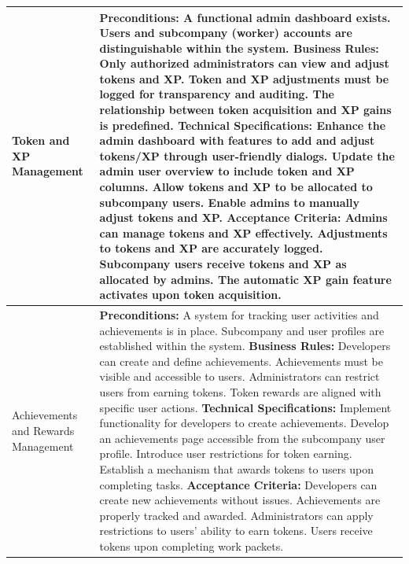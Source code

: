\begin{longtable}{|m{3cm}|m{12cm}|}
Token and XP Management &
\textbf{Preconditions:} \newline A functional admin dashboard exists. Users and subcompany (worker) accounts are distinguishable within the system. \newline
\textbf{Business Rules:} \newline Only authorized administrators can view and adjust tokens and XP. Token and XP adjustments must be logged for transparency and auditing. The relationship between token acquisition and XP gains is predefined. \newline
\textbf{Technical Specifications:} \newline Enhance the admin dashboard with features to add and adjust tokens/XP through user-friendly dialogs. Update the admin user overview to include token and XP columns. Allow tokens and XP to be allocated to subcompany users. Enable admins to manually adjust tokens and XP. \newline
\textbf{Acceptance Criteria:} \newline Admins can manage tokens and XP effectively. Adjustments to tokens and XP are accurately logged. Subcompany users receive tokens and XP as allocated by admins. The automatic XP gain feature activates upon token acquisition. \\
\hline

Achievements and Rewards Management &
\textbf{Preconditions:} \newline A system for tracking user activities and achievements is in place. Subcompany and user profiles are established within the system. \newline
\textbf{Business Rules:} \newline Developers can create and define achievements. Achievements must be visible and accessible to users. Administrators can restrict users from earning tokens. Token rewards are aligned with specific user actions. \newline
\textbf{Technical Specifications:} \newline Implement functionality for developers to create achievements. Develop an achievements page accessible from the subcompany user profile. Introduce user restrictions for token earning. Establish a mechanism that awards tokens to users upon completing tasks. \newline
\textbf{Acceptance Criteria:} \newline Developers can create new achievements without issues. Achievements are properly tracked and awarded. Administrators can apply restrictions to users' ability to earn tokens. Users receive tokens upon completing work packets. \\
\hline

\end{longtable}

